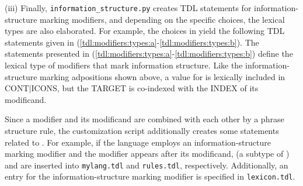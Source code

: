 (iii) Finally, \texttt{information{\_}structure.py} creates TDL
statements for information-structure marking modifiers, and depending
on the specific choices, the lexical types are also elaborated. For
example, the choices in  yield the following
TDL statements given in
(\ref{tdl:modifiers:types:a}-\ref{tdl:modifiers:types:b}). The 
statements presented in
(\ref{tdl:modifiers:types:a}-\ref{tdl:modifiers:types:b}) define the
lexical type of modifiers that mark information
structure. Like the information-structure marking
adpositions shown above, a value for  is lexically
included in CONT{$\mid$}ICONS, but the TARGET is co-indexed with the
INDEX of its modificand.






\noindent Since a modifier and its modificand are combined with each
other by a phrase structure rule, the customization script
additionally creates some  statements related to
. For example, if the language employs an
information-structure marking modifier and the modifier appears after
its modificand,  (a subtype of
) and  are
inserted into \texttt{mylang.tdl} and \texttt{rules.tdl},
respectively. Additionally, an entry for the information-structure
marking modifier is specified in \texttt{lexicon.tdl}.




